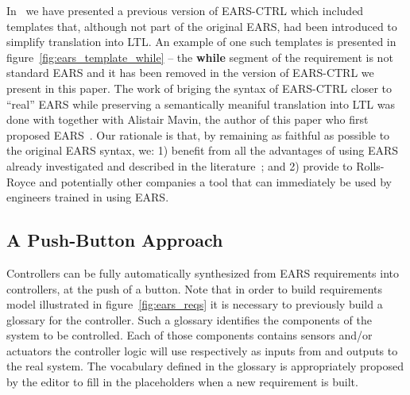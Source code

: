 In~\cite{LucioRCM17} we have presented a previous version of \textsf{EARS-CTRL}
which included templates that, although not part of the original EARS, had been
introduced to simplify translation into LTL.  An example of one such templates
is presented in figure~\ref{fig:ears_template_while} -- the \textbf{while} segment of the
requirement is not standard EARS and it has been removed in the version of
\textsf{EARS-CTRL} we present in this paper. The work of briging the syntax of
\textsf{EARS-CTRL} closer to ``real'' EARS while preserving a semantically
meaniful translation into LTL was done with together with Alistair Mavin, the
author of this paper who first proposed EARS~\cite{EARS09}.
Our rationale is that, by remaining as faithful as possible to the original
EARS syntax, we: 1) benefit from all the advantages of using EARS already
investigated and described in the literature~\cite{EARS09,EARS16}; and 2)
provide to Rolls-Royce and potentially other companies a tool that can immediately be used by engineers trained in using EARS.


%
% 

\subsection{A Push-Button Approach}

Controllers can be fully automatically synthesized from EARS requirements into
controllers, at the push of a button. Note that in order to build requirements
model illustrated in figure~\ref{fig:ears_reqs} it is necessary to previously
build a glossary for the controller. Such a glossary identifies the components
of the system to be controlled. Each of those components contains sensors
and/or actuators the controller logic will use respectively as inputs from and
outputs to the real system. The vocabulary defined in the glossary is
appropriately proposed by the editor to fill in the placeholders when a new
requirement is built.

